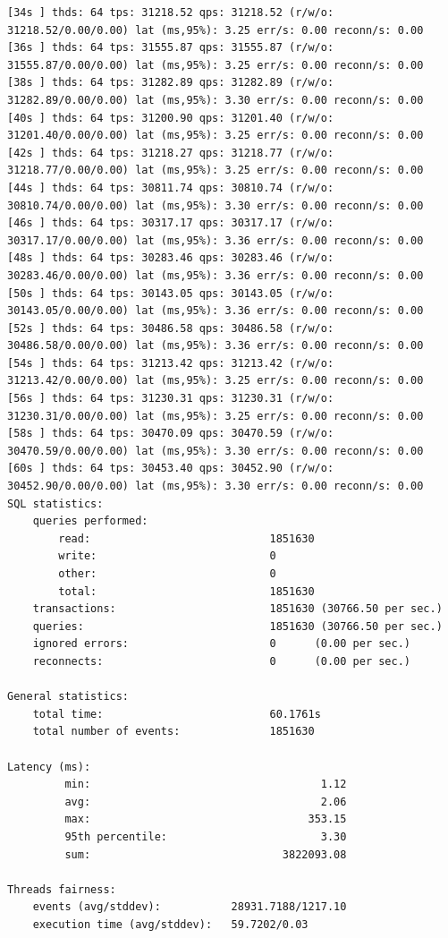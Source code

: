 \documentclass{article}
\begin{document}
\begin{verbatim}
[34s ] thds: 64 tps: 31218.52 qps: 31218.52 (r/w/o: 31218.52/0.00/0.00) lat (ms,95%): 3.25 err/s: 0.00 reconn/s: 0.00
[36s ] thds: 64 tps: 31555.87 qps: 31555.87 (r/w/o: 31555.87/0.00/0.00) lat (ms,95%): 3.25 err/s: 0.00 reconn/s: 0.00
[38s ] thds: 64 tps: 31282.89 qps: 31282.89 (r/w/o: 31282.89/0.00/0.00) lat (ms,95%): 3.30 err/s: 0.00 reconn/s: 0.00
[40s ] thds: 64 tps: 31200.90 qps: 31201.40 (r/w/o: 31201.40/0.00/0.00) lat (ms,95%): 3.25 err/s: 0.00 reconn/s: 0.00
[42s ] thds: 64 tps: 31218.27 qps: 31218.77 (r/w/o: 31218.77/0.00/0.00) lat (ms,95%): 3.25 err/s: 0.00 reconn/s: 0.00
[44s ] thds: 64 tps: 30811.74 qps: 30810.74 (r/w/o: 30810.74/0.00/0.00) lat (ms,95%): 3.30 err/s: 0.00 reconn/s: 0.00
[46s ] thds: 64 tps: 30317.17 qps: 30317.17 (r/w/o: 30317.17/0.00/0.00) lat (ms,95%): 3.36 err/s: 0.00 reconn/s: 0.00
[48s ] thds: 64 tps: 30283.46 qps: 30283.46 (r/w/o: 30283.46/0.00/0.00) lat (ms,95%): 3.36 err/s: 0.00 reconn/s: 0.00
[50s ] thds: 64 tps: 30143.05 qps: 30143.05 (r/w/o: 30143.05/0.00/0.00) lat (ms,95%): 3.36 err/s: 0.00 reconn/s: 0.00
[52s ] thds: 64 tps: 30486.58 qps: 30486.58 (r/w/o: 30486.58/0.00/0.00) lat (ms,95%): 3.36 err/s: 0.00 reconn/s: 0.00
[54s ] thds: 64 tps: 31213.42 qps: 31213.42 (r/w/o: 31213.42/0.00/0.00) lat (ms,95%): 3.25 err/s: 0.00 reconn/s: 0.00
[56s ] thds: 64 tps: 31230.31 qps: 31230.31 (r/w/o: 31230.31/0.00/0.00) lat (ms,95%): 3.25 err/s: 0.00 reconn/s: 0.00
[58s ] thds: 64 tps: 30470.09 qps: 30470.59 (r/w/o: 30470.59/0.00/0.00) lat (ms,95%): 3.30 err/s: 0.00 reconn/s: 0.00
[60s ] thds: 64 tps: 30453.40 qps: 30452.90 (r/w/o: 30452.90/0.00/0.00) lat (ms,95%): 3.30 err/s: 0.00 reconn/s: 0.00
SQL statistics:
    queries performed:
        read:                            1851630
        write:                           0
        other:                           0
        total:                           1851630
    transactions:                        1851630 (30766.50 per sec.)
    queries:                             1851630 (30766.50 per sec.)
    ignored errors:                      0      (0.00 per sec.)
    reconnects:                          0      (0.00 per sec.)

General statistics:
    total time:                          60.1761s
    total number of events:              1851630

Latency (ms):
         min:                                    1.12
         avg:                                    2.06
         max:                                  353.15
         95th percentile:                        3.30
         sum:                              3822093.08

Threads fairness:
    events (avg/stddev):           28931.7188/1217.10
    execution time (avg/stddev):   59.7202/0.03
\end{verbatim}
\end{document}
